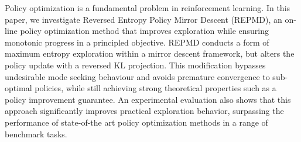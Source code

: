 
Policy optimization is a fundamental problem in reinforcement learning.
In this paper, 
we investigate Reversed Entropy Policy Mirror Descent (REPMD), 
an on-line policy optimization method that improves exploration
while ensuring monotonic progress in a principled objective.
REPMD conducts a form of maximum entropy exploration
within a mirror descent framework,
but alters the policy update with a reversed KL projection.
This modification bypasses undesirable mode seeking behaviour
and avoids premature convergence to sub-optimal policies,
while still achieving strong theoretical properties
such as a policy improvement guarantee.
An experimental evaluation also
shows that this approach significantly improves practical exploration behavior,
surpassing the performance of state-of-the art policy optimization methods
in a range of benchmark tasks.


